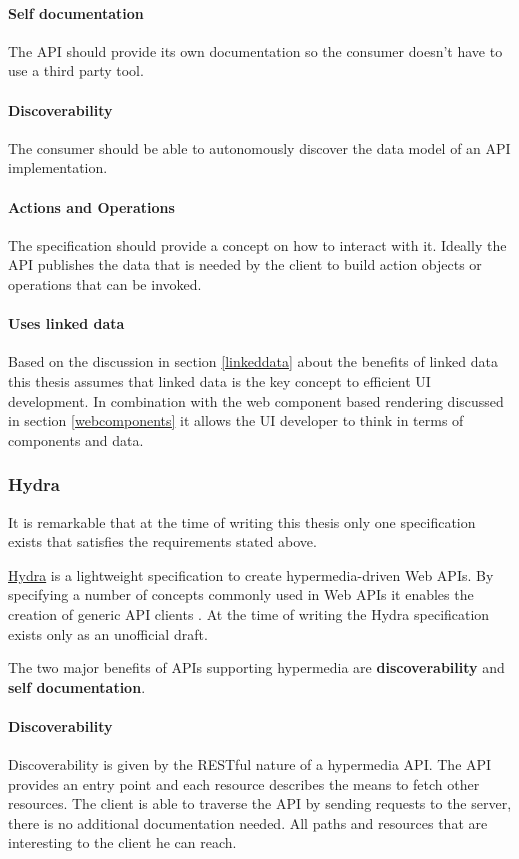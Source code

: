 \paragraph{Self documentation}
The API should provide its own documentation so the consumer doesn't have to use a third party tool.

\paragraph{Discoverability}
The consumer should be able to autonomously discover the data model of an API implementation.

\paragraph{Actions and Operations}
The specification should provide a concept on how to interact with it. Ideally the API publishes the data that is needed by the client to build action objects or operations that can be invoked.

\paragraph{Uses linked data}
Based on the discussion in section \ref{linkeddata} about the benefits of linked data this thesis assumes that linked data is the key concept to efficient UI development. In combination with the web component based rendering discussed in section \ref{webcomponents} it allows the UI developer to think in terms of components and data.

\subsubsection{Hydra}
It is remarkable that at the time of writing this thesis only one specification exists that satisfies the requirements stated above.

\href{http://www.hydra-cg.com/}{Hydra} is a lightweight specification to create hypermedia-driven Web APIs. By specifying a number of concepts commonly used in Web APIs it enables the creation of generic API clients \citep{hydraspecs}. At the time of writing the Hydra specification exists only as an unofficial draft.

The two major benefits of APIs supporting hypermedia are \textbf{discoverability} and \textbf{self documentation}. \\
\paragraph{Discoverability} Discoverability is given by the RESTful nature of a hypermedia API. The API provides an entry point and each resource describes the means to fetch other resources. The client is able to traverse the API by sending requests to the server, there is no additional documentation needed. All paths and resources that are interesting to the client he can reach.

